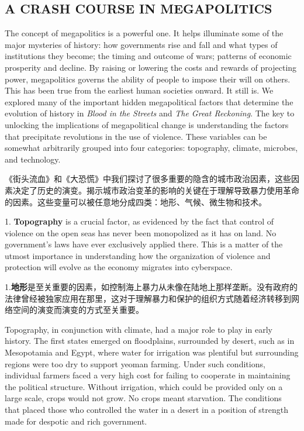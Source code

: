 \begin{Parallel}{97mm}{45mm}
  \section{A CRASH COURSE IN MEGAPOLITICS}

  \ParallelLText
  {The concept of megapolitics is a powerful one. It helps illuminate some of the major mysteries of history: how governments rise and fall and what types of institutions they become; the timing and outcome of wars; patterns of economic prosperity and decline. By raising or lowering the costs and rewards of projecting power, megapolitics governs the ability of people to impose their will on others. This has been true from the earliest human societies onward. It still is. We explored many of the important hidden megapolitical factors that determine the evolution of history in \emph{Blood in the Streets} and \emph{The Great Reckoning}. The key to unlocking the implications of megapolitical change is understanding the factors that precipitate revolutions in the use of violence. These variables can be somewhat arbitrarily grouped into four categories: topography, climate, microbes, and technology.}
  
  \ParallelRText
  {《街头流血》和《大恐慌》中我们探讨了很多重要的隐含的城市政治因素，这些因素决定了历史的演变。揭示城市政治变革的影响的关键在于理解导致暴力使用革命的因素。这些变量可以被任意地分成四类：地形、气候、微生物和技术。}
  \ParallelPar



  \ParallelLText
  {1. \textbf{Topography} is a crucial factor, as evidenced by the fact that control of violence on the open seas has never been monopolized as it has on land. No government's laws have ever exclusively applied there. This is a matter of the utmost importance in understanding how the organization of violence and protection will evolve as the economy migrates into cyberspace.}
  
  \ParallelRText
  {1.\textbf{地形}是至关重要的因素，如控制海上暴力从未像在陆地上那样垄断。没有政府的法律曾经被独家应用在那里，这对于理解暴力和保护的组织方式随着经济转移到网络空间的演变而演变的方式至关重要。}
  \ParallelPar


  \ParallelLText
  {Topography, in conjunction with climate, had a major role to play in early history. The first states emerged on floodplains, surrounded by desert, such as in Mesopotamia and Egypt, where water for irrigation was plentiful but surrounding regions were too dry to support yeoman farming. Under such conditions, individual farmers faced a very high cost for failing to cooperate in maintaining the political structure. Without irrigation, which could be provided only on a large scale, crops would not grow. No crops meant starvation. The conditions that placed those who controlled the water in a desert in a position of strength made for despotic and rich government.}
  

\end{Parallel}
